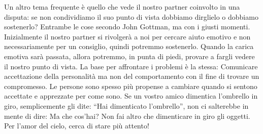 \documentclass[12pt]{book} %
\begin{document}
Un altro tema frequente è quello che vede il nostro partner coinvolto in una disputa: se non condividiamo il suo punto
di vista dobbiamo dirglielo o dobbiamo sostenerlo? Entrambe le cose secondo John Gottman, ma con i giusti momenti.
Inizialmente il nostro partner si rivolgerà a noi per cercare aiuto emotivo e non necessariamente per un consiglio, quindi potremmo sostenerlo. Quando la carica emotiva sarà passata, allora potremmo, in punta di piedi, provare a fargli vedere il
nostro punto di vista. La base per affrontare i problemi è la stessa: Comunicare accettazione della personalità ma non del comportamento con il fine di trovare un compromesso.
Le persone sono spesso più propense a cambiare quando si sentono accettate e apprezzate per come sono. Se un vostro amico dimentica l'ombrello
in giro, semplicemente gli dite: “Hai dimenticato l'ombrello”, non ci salterebbe in mente di
dire: Ma che cos'hai? Non fai altro che dimenticare in giro gli oggetti. Per
l'amor del cielo, cerca di stare più attento! 
\end{document}
